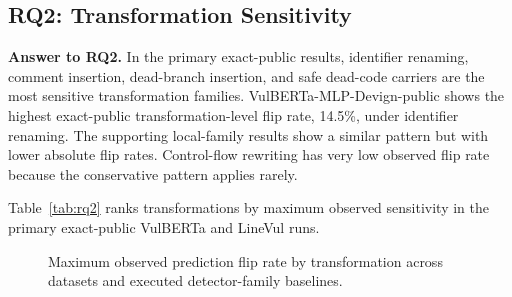 \documentclass[a4paper,fleqn]{cas-dc}
\begin{document}
\subsection{RQ2: Transformation Sensitivity}

\textbf{Answer to RQ2.} In the primary exact-public results, identifier
renaming, comment insertion, dead-branch insertion, and safe dead-code carriers
are the most sensitive transformation families. VulBERTa-MLP-Devign-public
shows the highest exact-public transformation-level flip rate, 14.5\%, under
identifier renaming. The supporting local-family results show a similar pattern
but with lower absolute flip rates. Control-flow rewriting has very low
observed flip rate because the conservative pattern applies rarely.

Table~\ref{tab:rq2} ranks transformations by maximum observed sensitivity in
the primary exact-public VulBERTa and LineVul runs.

\begin{table}[t]
  \centering
  \caption{Transformation sensitivity.}
  \label{tab:rq2}
\end{table}

\begin{figure}[t]
  \centering
  \resizebox{\columnwidth}{!}{}
  \caption{Maximum observed prediction flip rate by transformation across datasets and executed detector-family baselines.}
  \label{fig:transformation-sensitivity}
\end{figure}
\end{document}
